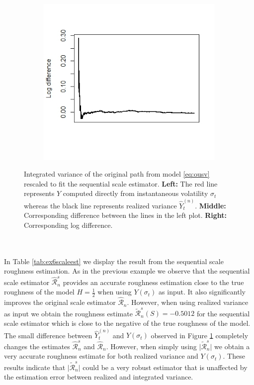 \documentclass{article}
\begin{document}
\begin{figure}[h]
\begin{subfigure}{0.32\textwidth}
    \end{subfigure}\hfill
    \begin{subfigure}{0.32\textwidth}
        \centering
        \includegraphics[width=\textwidth]{ex6_scale3.jpeg}
    \end{subfigure}
    \caption{Integrated variance of the original path from model \eqref{eq:ousv} rescaled to fit the sequential scale estimator. \textbf{Left:} The red line represents $Y$ computed directly from instantaneous volatility $\sigma_t$ whereas the black line represents realized variance $\hat{Y}_t^{(n)}$. \textbf{Middle:} Corresponding difference between the lines in the left plot. \textbf{Right:} Corresponding log difference.}
    \label{fig:ex6scale}
\end{figure}\\\\
In Table \ref{tab:ex6scaleest} we display the result from the sequential scale roughness estimation. As in the previous example we observe that the sequential scale estimator $\widehat{\mathscr{R}}_n^s$ provides an accurate roughness estimation close to the true roughness of the model $H=\frac{1}{2}$ when using $Y(\sigma_t)$ as input. It also significantly improves the original scale estimator $\widehat{\mathscr{R}}_n$. However, when using realized variance as input we obtain the roughness estimate $\widetilde{\mathscr{R}}_n^s (S) = -0.5012$ for the sequential scale estimator which is close to the negative of the true roughness of the model. The small difference between $\hat{Y}_t^{(n)}$ and $Y(\sigma_t)$ observed in Figure \ref{fig:ex6scale} completely changes the estimates $\widehat{\mathscr{R}}_n^s$ and $\widehat{\mathscr{R}}_n$. However, when simply using $\lvert \widetilde{\mathscr{R}}_n^s \rvert$ we obtain a very accurate roughness estimate for both realized variance and $Y(\sigma_t)$. These results indicate that $\lvert \widetilde{\mathscr{R}}_n^s \rvert$ could be a very robust estimator that is unaffected by the estimation error between realized and integrated variance.
\end{document}
